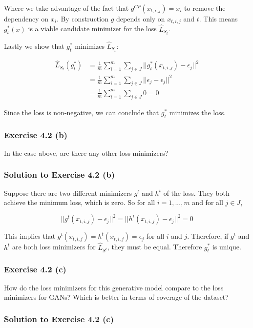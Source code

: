 \documentclass[
10pt, %
a4paper, %
oneside, %
headinclude,footinclude, %
BCOR5mm, %
]{scrartcl}
\begin{document}
Where we take advantage of the fact that $g^{CP}(x_{t,i,j}) = x_i$ to remove the dependency on $x_i$. By construction $g$ depends only on $x_{t,i,j}$ and $t$. This means $g^*_t(x)$ is a viable candidate minimizer for the loss $\hat{L}_{S_t}$.

Lastly we show that $g^*_t$ minimizes $\hat{L}_{S_t}$:

\begin{align*}
  \hat{L}_{S_t}(g^*_t) &= \frac{1}{m} \sum_{i=1}^{m} \sum_{j \in J} ||g^*_t (x_{t,i,j} ) - \epsilon_j ||^2 \\
  &= \frac{1}{m} \sum_{i=1}^{m} \sum_{j \in J} ||\epsilon_j - \epsilon_j ||^2 \\
  &= \frac{1}{m} \sum_{i=1}^{m} \sum_{j \in J} 0 = 0
\end{align*}

Since the loss is non-negative, we can conclude that $g^*_t$ minimizes the loss.

\subsubsection*{Exercise 4.2 (b)}
In the case above, are there any other loss minimizers?

\subsubsection*{Solution to Exercise 4.2 (b)}

Suppose there are two different minimizers $g^t$ and $h^t$ of the loss. They both achieve the minimum loss, which is zero. So for all $i = 1, ..., m$ and for all $j \in J$,

\begin{equation*}
  ||g^t(x_{t,i,j}) - \epsilon_j||^2 = ||h^t(x_{t,i,j}) - \epsilon_j||^2 = 0
\end{equation*}

This implies that $g^t(x_{t,i,j}) = h^t(x_{t,i,j}) = \epsilon_j$ for all $i$ and $j$. Therefore, if $g^t$ and $h^t$ are both loss minimizers for $\hat{L}_{S^t}$, they must be equal. Therefore $g^*_t$ is unique.

\subsubsection*{Exercise 4.2 (c)}
How do the loss minimizers for this generative model compare to the loss minimizers for GANs? Which is better in terms of coverage of the dataset?

\subsubsection*{Solution to Exercise 4.2 (c)}
\end{document}
